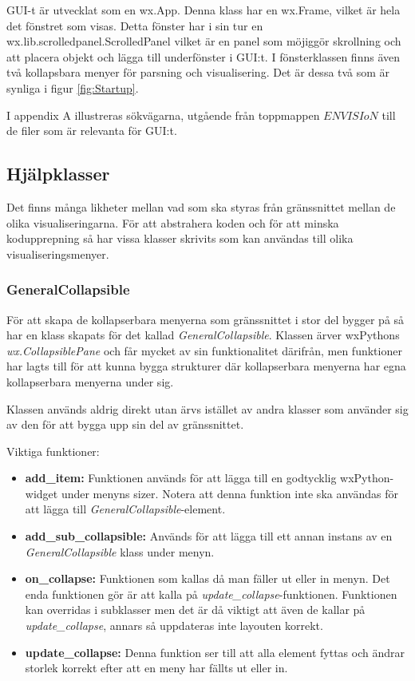 GUI-t är utvecklat som en wx.App. Denna klass har en wx.Frame, vilket är hela det fönstret som visas. Detta fönster har i sin tur en wx.lib.scrolledpanel.ScrolledPanel vilket är en panel som möjiggör skrollning och att placera objekt och lägga till underfönster i GUI:t. I fönsterklassen finns även två kollapsbara menyer för parsning och visualisering. Det är dessa två som är synliga i figur \ref{fig:Startup}.

I appendix A illustreras sökvägarna, utgående från toppmappen $ENVISIoN$ till de filer som är relevanta för GUI:t.

\subsection{Hjälpklasser}
Det finns många likheter mellan vad som ska styras från gränssnittet mellan de olika visualiseringarna. För att abstrahera koden och för att minska kodupprepning så har vissa klasser skrivits som kan användas till olika visualiseringsmenyer.

\subsubsection{GeneralCollapsible}
För att skapa de kollapserbara menyerna som gränssnittet i stor del bygger på så har en klass skapats för det kallad \textit{GeneralCollapsible}. Klassen ärver wxPythons \textit{wx.CollapsiblePane} och får mycket av sin funktionalitet därifrån, men funktioner har lagts till för att kunna bygga strukturer där kollapserbara menyerna har egna kollapserbara menyerna under sig. 

Klassen används aldrig direkt utan ärvs istället av andra klasser som använder sig av den för att bygga upp sin del av gränssnittet.

\newpage

Viktiga funktioner:
\begin{itemize}
    \setlength\itemsep{0em}
    \item \textbf{add\_item: } Funktionen används för att lägga till en godtycklig wxPython-widget under menyns sizer. Notera att denna funktion inte ska användas för att lägga till \textit{GeneralCollapsible}-element. 
    \item \textbf{add\_sub\_collapsible: } Används för att lägga till ett annan instans av en \textit{GeneralCollapsible} klass under menyn.
    \item \textbf{on\_collapse: } Funktionen som kallas då man fäller ut eller in menyn. Det enda funktionen gör är att kalla på \textit{update\_collapse}-funktionen. Funktionen kan overridas i subklasser men det är då viktigt att även de kallar på \textit{update\_collapse}, annars så uppdateras inte layouten korrekt.
    \item \textbf{update\_collapse: } Denna funktion ser till att alla element fyttas och ändrar storlek korrekt efter att en meny har fällts ut eller in. 
\end{itemize}

